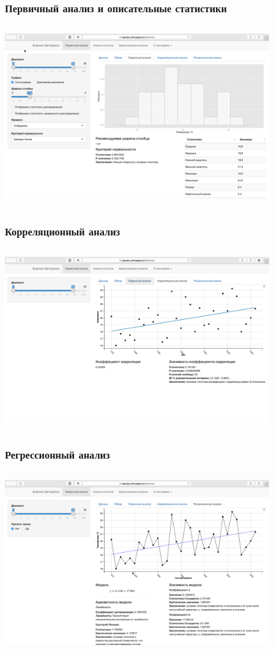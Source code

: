 \documentclass[10pt, pdf,aspectratio=169]{beamer}
\begin{document}
\begin{frame}
  \frametitle{Первичный анализ и описательные статистики}   %
   \begin{columns}[c]
   \column{4.5in}
  \includegraphics[width=4.5in]{../../figures/static/1_basis.png}
  \end{columns}
\end{frame}

\begin{frame}
  \frametitle{Корреляционный анализ}   %
   \begin{columns}[c]
   \column{4.5in}
  \includegraphics[width=4.5in]{../../figures/static/p_corr.png}
  \end{columns}
\end{frame}

\begin{frame}
  \frametitle{Регрессионный анализ}   %
   \begin{columns}[c]
   \column{4.5in}
  \includegraphics[width=4.5in]{../../figures/static/2_regr.png}
  \end{columns}
\end{frame}
\end{document}
